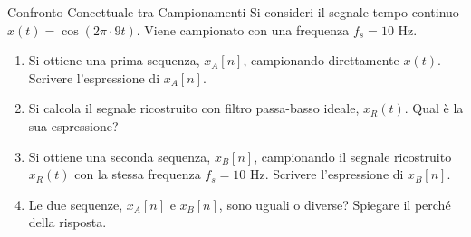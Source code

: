 
\begin{esercizio}{Confronto Concettuale tra Campionamenti}
    Si consideri il segnale tempo-continuo $x(t) = \cos(2\pi \cdot 9t)$. Viene campionato con una frequenza $f_s = 10$ Hz.
    
    \begin{enumerate}
        \item Si ottiene una prima sequenza, $x_A[n]$, campionando direttamente $x(t)$. Scrivere l'espressione di $x_A[n]$.
        \item Si calcola il segnale ricostruito con filtro passa-basso ideale, $x_R(t)$. Qual è la sua espressione?
        \item Si ottiene una seconda sequenza, $x_B[n]$, campionando il segnale ricostruito $x_R(t)$ con la stessa frequenza $f_s=10$ Hz. Scrivere l'espressione di $x_B[n]$.
        \item Le due sequenze, $x_A[n]$ e $x_B[n]$, sono uguali o diverse? Spiegare il perché della risposta.
    \end{enumerate}
\end{esercizio}
